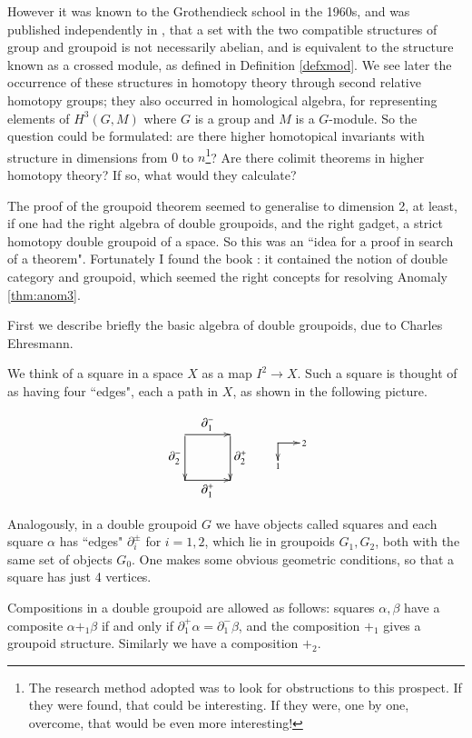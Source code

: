 \documentclass{elsarticle}
\makeatletter
\newcommand{\directs}[2]{\def\objectstyle{\scriptstyle}  \objectmargin={0pt}
\xy
(0,4)*+{}="a",(0,-2)*+{\rule{0em}{1.5ex}#2}="b",(7,4)*+{\;#1}="c"
\ar@{->} "a";"b" \ar @{->}"a";"c" \endxy }
\def\xybiglabels{\def\labelstyle{\textstyle}}
\makeatother
\begin{document}
However it was known to the Grothendieck school in the 1960s, and was published independently
in \cite{BS1}, that a set with the two compatible structures of group and groupoid is not
necessarily abelian, and is equivalent to the structure known as a crossed module, as defined in
Definition \ref{defxmod}. We see later the occurrence of these structures in homotopy theory  through   second
relative homotopy groups; they also occurred in homological algebra, for representing elements
of $H^ 3 (G, M)$  where $G$  is a group and $M$  is a $G$-module.
\newpage
So the question could be formulated: are there higher homotopical invariants with structure
in dimensions from $0$ to $n$\footnote{The research method adopted was to look for obstructions to this prospect. If they were found, that could
be interesting. If they were, one by one, overcome, that would be even more interesting!\label{footn:meth}}? Are there colimit theorems in higher homotopy theory?
If so, what would they calculate?

The proof of the groupoid theorem seemed to generalise to dimension 2, at least, if one
had the right algebra of double groupoids, and the right gadget, a strict homotopy double
groupoid of a space. So this was an ``idea for a proof in search of a theorem".
Fortunately I found the book \cite{Ehresmann-65}: it contained the notion of double category and groupoid, which seemed the right concepts for resolving Anomaly \ref{thm:anom3}.

First we describe briefly the basic algebra of double groupoids, due to Charles Ehresmann.

We  think of a square in a space $X$ as a map $I^2 \to X$. Such a square is thought of as having four ``edges", each a path in $X$, as shown in the following picture.

\begin{equation}
\xybiglabels
\vcenter{\xymatrix@M=0pt@=3pc{\ar [d]_{\partial^-_2 } \ar [r]^{\partial^-_1} & \ar [d]^{\partial ^+_2}\\
\ar [r]_{\partial^+_1} &  } }  \qquad \directs{2}{1}
\end{equation}

Analogously,  in a double groupoid $G$  we have objects called squares and each square $\alpha$ has ``edges" $\partial^\pm_i$ for $i=1,2$, which lie in groupoids $G_1,G_2$, both with the  same set of objects $G_0$. One makes some obvious geometric conditions, so that a square has just 4 vertices.

Compositions in a double groupoid are allowed as follows: squares $\alpha, \beta$ have a composite $\alpha +_1 \beta$ if and only if $\partial^+_1 \alpha = \partial^-_1 \beta$, and the composition $+_1$ gives a groupoid structure.  Similarly we have a composition $+_2$.
\end{document}
